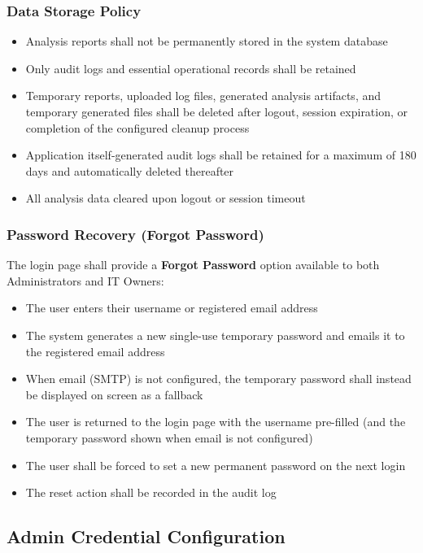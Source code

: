\documentclass[12pt,a4paper]{article}
\begin{document}
\subsubsection{Data Storage Policy}
\begin{itemize}
    \item Analysis reports shall not be permanently stored in the system database
    \item Only audit logs and essential operational records shall be retained
    \item Temporary reports, uploaded log files, generated analysis artifacts, and temporary generated files shall be deleted after logout, session expiration, or completion of the configured cleanup process
    \item Application itself-generated audit logs shall be retained for a maximum of 180 days and automatically deleted thereafter
    \item All analysis data cleared upon logout or session timeout
\end{itemize}

\subsubsection{Password Recovery (Forgot Password)}
The login page shall provide a \textbf{Forgot Password} option available to both Administrators and IT Owners:
\begin{itemize}
    \item The user enters their username or registered email address
    \item The system generates a new single-use temporary password and emails it to the registered email address
    \item When email (SMTP) is not configured, the temporary password shall instead be displayed on screen as a fallback
    \item The user is returned to the login page with the username pre-filled (and the temporary password shown when email is not configured)
    \item The user shall be forced to set a new permanent password on the next login
    \item The reset action shall be recorded in the audit log
\end{itemize}

\subsection{Admin Credential Configuration}
\end{document}
